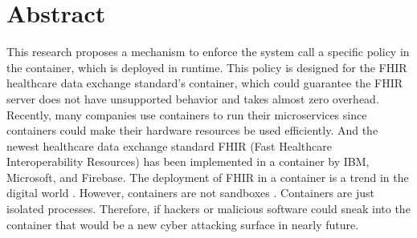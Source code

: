 \chapter*{Abstract}

This research proposes
a mechanism to enforce the system call a specific policy in the container, which is deployed in
runtime. This policy is designed for the FHIR healthcare data exchange standard's container, which
could guarantee the FHIR server does not have unsupported behavior and takes almost zero overhead.
Recently, many companies use containers to run their microservices since containers could
make their hardware resources be used efficiently. And the newest healthcare data exchange
standard FHIR (Fast Healthcare Interoperability Resources) \cite{FHIR_home} has been implemented
in a container by IBM, Microsoft, and Firebase. The deployment of FHIR in a container is a trend
in the digital world \cite{Infrastructures} . However, containers are not sandboxes \cite{10.5555/1267569.1267570}
. Containers are just isolated processes. Therefore, if hackers or malicious software could sneak
into the container that would be a new cyber attacking surface in nearly future.